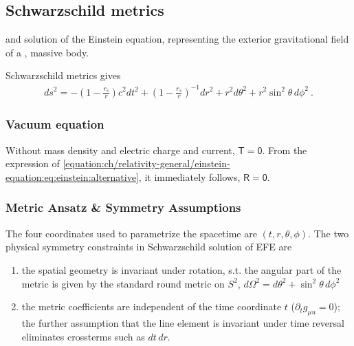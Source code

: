 \documentclass[letterpaper,10pt,english]{jupyterBook}
\begin{document}
\sphinxstepscope


\subsection{Schwarzschild metrics}
\label{\detokenize{ch/relativity-general/schwarzschild-metric:schwarzschild-metrics}}\label{\detokenize{ch/relativity-general/schwarzschild-metric:relativity-general-notes-examples-schwarzschild}}\label{\detokenize{ch/relativity-general/schwarzschild-metric::doc}}
\sphinxAtStartPar
{} and  solution of the Einstein equation, representing the exterior gravitational field of a ,  massive body.

\sphinxAtStartPar
Schwarzschild metrics gives
\begin{equation}\label{equation:ch/relativity-general/schwarzschild-metric:eq:schwarzschild-metrics}
\begin{split}
ds^2 =
- \left(1 - \frac{r_s}{r} \right) c^2 dt^2 + 
  \left(1 - \frac{r_s}{r} \right)^{-1} dr^2 + r^2 d \theta^2 + r^2 \sin^2 \theta \, d\phi^2 \ .
\end{split}
\end{equation}\subsubsection*{Vacuum equation}

\sphinxAtStartPar
Without mass density and electric charge and current, \(\mathsf{T} = \mathsf{0}\). From the expression of \eqref{equation:ch/relativity-general/einstein-equation:eq:einstein:alternative}, it immediately follows, \(\mathsf{R} = \mathsf{0}\).


\subsubsection{Metric Ansatz \& Symmetry Assumptions}
\label{\detokenize{ch/relativity-general/schwarzschild-metric:metric-ansatz-symmetry-assumptions}}
\sphinxAtStartPar
The four coordinates used to parametrize the space\sphinxhyphen{}time are \((t, r, \theta, \phi)\). The two physical symmetry constraints in Schwarzschild solution of EFE are
\begin{enumerate}
%
\item {} 
\sphinxAtStartPar
{} the spatial geometry is invariant under rotation, s.t. the angular part of the metric is given by the standard round metric on \(S^2\), \(d\Omega^2 = d \theta^2 + \sin^2 \theta \, d\phi^2\)

\item {} 
\sphinxAtStartPar
{} the metric coefficients are independent of the time coordinate \(t\) (\(\partial_t g_{\mu
u} = 0\)); the further assumption that the line element is invariant under time reversal eliminates cross\sphinxhyphen{}terms such as \(dt\,dr\).

\end{enumerate}
\end{document}
